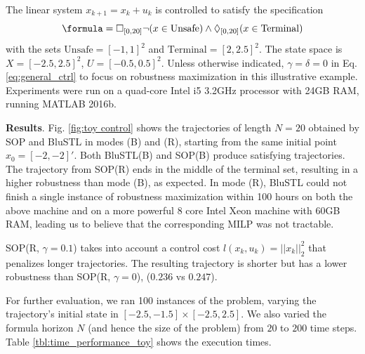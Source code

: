 \begin{exmp}
\label{ex:toyproblem}
The linear system $x_{k+1} = x_k + u_k$ is controlled
to satisfy the specification
\[\formula = \always_{[0,20]} \neg (x \in \text{Unsafe}) \land \eventually_{[0,20]} (x \in \text{Terminal})\]
with the sets $\text{Unsafe}=[-1,1]^2$ and $\text{Terminal}=[2,2.5]^2$. 
The state space is $X=[-2.5,2.5]^2$, $U=[-0.5,0.5]^2$.
Unless otherwise indicated, $\gamma=\delta=0$ in Eq. \eqref{eq:general_ctrl} to focus on robustness maximization in this illustrative example. 
Experiments were run on a quad-core Intel i5 3.2GHz processor with 24GB RAM, running MATLAB 2016b.

\textbf{Results}.
Fig. \ref{fig:toy control} shows the trajectories of length $N=20$ obtained by SOP and BluSTL in modes (B) and (R), starting from the same initial point $x_0=[-2,-2]'$.
Both BluSTL(B) and SOP(B) produce satisfying trajectories. 
The trajectory from SOP(R) ends in the middle of the terminal set, resulting in a higher robustness than mode (B), as expected. 
In mode (R), BluSTL could not finish a single instance of robustness maximization within 100 hours on both the above machine and on a more powerful 8 core Intel Xeon machine with 60GB RAM, leading us to believe that the corresponding MILP was not tractable.
 
SOP(R, $\gamma\!=\!0.1$) takes into account a control cost $l(x_k,u_k) = ||x_k||_{2}^2$ that penalizes longer trajectories.
The resulting trajectory is shorter but has a lower robustness than SOP(R, $\gamma = 0$), ($0.236$ vs $0.247$).

For further evaluation, we ran 100 instances of the problem, varying the trajectory's initial state in $[-2.5,-1.5] \times [-2.5,2.5]$. 
We also varied the formula horizon $N$ (and hence the size of the problem) from $20$ to $200$ time steps. 
Table \ref{tbl:time_performance_toy} shows the execution times. 


\end{exmp}
